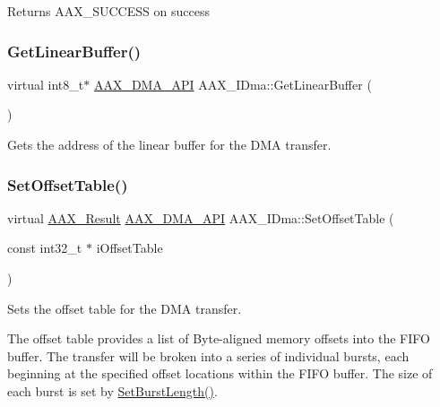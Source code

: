 \begin{DoxyReturn}{Returns}
{\ttfamily A\+A\+X\+\_\+\+S\+U\+C\+C\+E\+SS} on success 
\end{DoxyReturn}
\mbox{\label{a01809_a5a23f32e268d310ea6c80049c1661982}} 
\subsubsection{\texorpdfstring{GetLinearBuffer()}{GetLinearBuffer()}}
{\footnotesize\ttfamily virtual int8\+\_\+t$\ast$ \mbox{\hyperlink{a00587_acae60d01e5e4bd3282369d0d9d378f3f}{A\+A\+X\+\_\+\+D\+M\+A\+\_\+\+A\+PI}} A\+A\+X\+\_\+\+I\+Dma\+::\+Get\+Linear\+Buffer (\begin{DoxyParamCaption}{ }\end{DoxyParamCaption})\hspace{0.3cm}{\ttfamily [pure virtual]}}



Gets the address of the linear buffer for the D\+MA transfer. 

\mbox{\label{a01809_a9a106088088a8fc812b137bd90c0fa3a}} 
\subsubsection{\texorpdfstring{SetOffsetTable()}{SetOffsetTable()}}
{\footnotesize\ttfamily virtual \mbox{\hyperlink{a00392_a4d8f69a697df7f70c3a8e9b8ee130d2f}{A\+A\+X\+\_\+\+Result}} \mbox{\hyperlink{a00587_acae60d01e5e4bd3282369d0d9d378f3f}{A\+A\+X\+\_\+\+D\+M\+A\+\_\+\+A\+PI}} A\+A\+X\+\_\+\+I\+Dma\+::\+Set\+Offset\+Table (\begin{DoxyParamCaption}\item[{const int32\+\_\+t $\ast$}]{i\+Offset\+Table }\end{DoxyParamCaption})\hspace{0.3cm}{\ttfamily [pure virtual]}}



Sets the offset table for the D\+MA transfer. 

The offset table provides a list of Byte-\/aligned memory offsets into the F\+I\+FO buffer. The transfer will be broken into a series of individual bursts, each beginning at the specified offset locations within the F\+I\+FO buffer. The size of each burst is set by \mbox{\hyperlink{a01809_ac85fdea20b072cbdc258aa398d02fa92}{Set\+Burst\+Length()}}.

